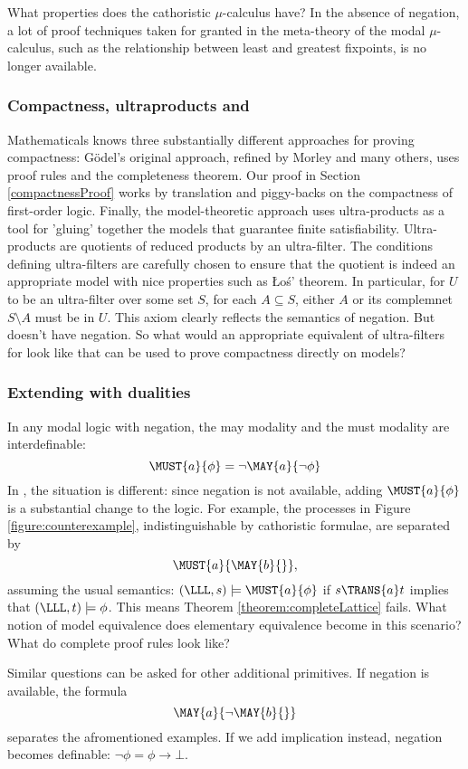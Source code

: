  What properties does the
cathoristic $\mu$-calculus have? In the absence of negation, a lot of proof
techniques taken for granted in the meta-theory of the modal
$\mu$-calculus, such as the relationship between least and greatest
fixpoints, is no longer available.


\subsubsection{Compactness, ultraproducts and \cathoristic{}}

Mathematicals knows three substantially different approaches for
proving compactness: G\"odel's original approach, refined by Morley
and many others, uses proof rules and the completeness theorem.  Our
proof in Section \ref{compactnessProof} works by translation and
piggy-backs on the compactness of first-order logic. Finally, the
model-theoretic approach uses ultra-products as a tool for 'gluing'
together the models that guarantee finite
satisfiability. Ultra-products are quotients of reduced products by an
ultra-filter. The conditions defining ultra-filters are carefully
chosen to ensure that the quotient is indeed an appropriate model with
nice properties such as \L{}o\'{s}' theorem. In particular, for $U$ to
be an ultra-filter over some set $S$, for each $A \subseteq S$, either
$A$ or its complemnet $S\setminus A$ must be in $U$. This axiom
clearly reflects the semantics of negation. But \cathoristic{} doesn't
have negation. So what would an appropriate equivalent of
ultra-filters for \cathoristic{} look like that can be used to prove
compactness directly on models?

\subsubsection{Extending \cathoristic{} with dualities}
In any modal logic with negation, the may modality and the must modality are interdefinable:
\[
\MUST{a}{\phi} = \neg
\MAY{a}{\neg \phi}
\]
In \cathoristic{}, the situation is different: since
negation is not available, adding $\MUST{a}{\phi}$ is a substantial
change to the logic.
For example, the processes in Figure
\ref{figure:counterexample}, indistinguishable by cathoristic formulae, are
separated by
  \[
     \MUST{a}{\MAY{b}{}},
  \]
  assuming the usual semantics: $(\LLL, s) \models \MUST{a}{\phi}$ if
  $s \TRANS{a} t$ implies that $(\LLL, t) \models \phi$. This means
  Theorem \ref{theorem:completeLattice} fails. What notion of model
  equivalence does elementary equivalence become in this scenario?
  What do complete proof rules look like?

  Similar questions can be asked for other additional primitives. If negation is 
  available, the formula
  \[
     \MAY{a}{\neg \MAY{b}{} }
  \]
  separates the afromentioned examples. If we add implication instead,
  negation becomes definable: $\neg \phi = \phi \rightarrow \bot$.

